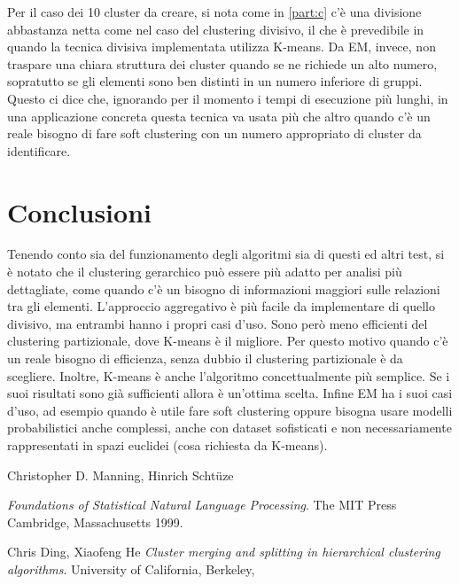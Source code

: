 \documentclass{llncs}
\begin{document}
	Per il caso dei 10 cluster da creare, si nota come in \ref{part:c} c'è una divisione abbastanza netta come nel caso del clustering divisivo, il che è prevedibile in quando la tecnica divisiva 
	implementata utilizza K-means. Da EM, invece, non traspare una chiara struttura dei cluster quando se ne richiede un alto numero, sopratutto se gli elementi sono ben distinti in un numero inferiore di gruppi.
	Questo ci dice che, ignorando per il momento i tempi di esecuzione più lunghi, in una applicazione concreta questa tecnica va usata più che altro quando c'è un reale bisogno di fare soft clustering
	con un numero appropriato di cluster da identificare.  
	\clearpage
	\section{Conclusioni}
	Tenendo conto sia del funzionamento degli algoritmi sia di questi ed altri test, si è notato che il clustering gerarchico può essere più adatto per analisi più dettagliate, come quando c'è un
	bisogno di informazioni maggiori sulle relazioni tra gli elementi. L'approccio aggregativo è più facile da implementare di quello divisivo, ma entrambi hanno i propri casi d'uso. Sono però meno
	efficienti del clustering partizionale, dove K-means è il migliore. Per questo motivo quando c'è un reale bisogno di efficienza, senza dubbio il clustering partizionale è da scegliere. Inoltre,
	K-means è anche l'algoritmo concettualmente più semplice. Se i suoi risultati sono già sufficienti allora è un'ottima scelta. Infine EM ha i suoi casi d'uso, ad esempio quando è utile
	fare soft clustering oppure bisogna usare modelli probabilistici anche complessi, anche con dataset sofisticati e non necessariamente rappresentati in spazi euclidei 
	(cosa richiesta da K-means).



\begin{thebibliography}{9}
	Christopher D. Manning, Hinrich Scht{\"u}ze

	\textit{Foundations of Statistical Natural Language Processing}. 
	The MIT Press Cambridge, Massachusetts 1999.
	
	Chris Ding, Xiaofeng He
	\textit{Cluster merging and splitting in hierarchical clustering algorithms}.
	University of California, Berkeley,
\end{thebibliography}
	
	
\end{document}
